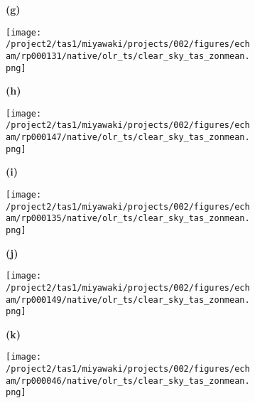 \documentclass[preview]{standalone}
\begin{document}
\begin{figure}
  \begin{subfigure}[t]{0.05\textwidth}
    \textbf{\normalsize{(g)}}
  \end{subfigure}
  \begin{subfigure}[t]{0.45\textwidth}
    \texttt{[image: /project2/tas1/miyawaki/projects/002/figures/echam/rp000131/native/olr\_ts/clear\_sky\_tas\_zonmean.png]}
  \end{subfigure}
  \begin{subfigure}[t]{0.05\textwidth}
    \textbf{\normalsize{(h)}}
  \end{subfigure}
  \begin{subfigure}[t]{0.45\textwidth}
    \texttt{[image: /project2/tas1/miyawaki/projects/002/figures/echam/rp000147/native/olr\_ts/clear\_sky\_tas\_zonmean.png]}
  \end{subfigure}

  \begin{subfigure}[t]{0.05\textwidth}
    \textbf{\normalsize{(i)}}
  \end{subfigure}
  \begin{subfigure}[t]{0.45\textwidth}
    \texttt{[image: /project2/tas1/miyawaki/projects/002/figures/echam/rp000135/native/olr\_ts/clear\_sky\_tas\_zonmean.png]}
  \end{subfigure}
  \begin{subfigure}[t]{0.05\textwidth}
    \textbf{\normalsize{(j)}}
  \end{subfigure}
  \begin{subfigure}[t]{0.45\textwidth}
    \texttt{[image: /project2/tas1/miyawaki/projects/002/figures/echam/rp000149/native/olr\_ts/clear\_sky\_tas\_zonmean.png]}
  \end{subfigure}
  
  \begin{subfigure}[t]{0.05\textwidth}
    \textbf{\normalsize{(k)}}
  \end{subfigure}
  \begin{subfigure}[t]{0.45\textwidth}
    \texttt{[image: /project2/tas1/miyawaki/projects/002/figures/echam/rp000046/native/olr\_ts/clear\_sky\_tas\_zonmean.png]}
  \end{subfigure}
\end{figure}
\end{document}
